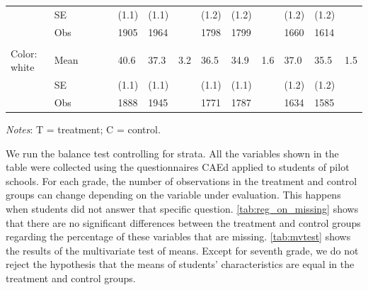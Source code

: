 \documentclass[
	article,			%
	12pt,				%
	oneside,			%
	a4paper,			%
	]{article}
\begin{document}
\begin{table}[h!]
\begin{tabular}{lp{2.335em}p{1.665em}p{1.665em}cp{1.665em}p{1.665em}cp{1.665em}p{1.665em}cp{1.665em}p{1.665em}c}
           &         SE &            &            &            &      (1.1) &      (1.1) &            &      (1.2) &      (1.2) &            &      (1.2) &      (1.2) &            \\

           &        Obs &            &            &            &       1905 &       1964 &            &       1798 &       1799 &            &       1660 &       1614 &            \\

           &            &            &            &            &            &            &            &            &            &            &            &            &            \\

Color: white &       Mean &            &            &            &       40.6 &       37.3 &       3.2 &       36.5 &       34.9 &        1.6 &       37.0 &       35.5 &        1.5 \\

           &         SE &            &            &            &      (1.1) &      (1.1) &            &      (1.1) &      (1.1) &            &      (1.2) &      (1.2) &            \\

           &        Obs &            &            &            &       1888 &       1945 &            &       1771 &       1787 &            &       1634 &       1585 &            \\

\hline
\end{tabular}  

\begin{tablenotes}
    
\item \textit{Notes}: T = treatment; C = control.

\item We run the balance test controlling for strata. All the variables shown in the table were collected using the questionnaires CAEd applied to students of pilot schools. For each grade, the number of observations in the treatment and control groups can change depending on the variable under evaluation. This happens when students did not answer that specific question. \autoref{tab:reg_on_missing} shows that there are no significant differences between the treatment and control groups regarding the percentage of these variables that are missing. \autoref{tab:mvtest} shows the results of the multivariate test of means. Except for seventh grade, we do not reject the hypothesis that the means of students' characteristics are equal in the treatment and control groups. 
\end{tablenotes}

\label{tab:studentscar}%
\end{table}%
\end{document}
